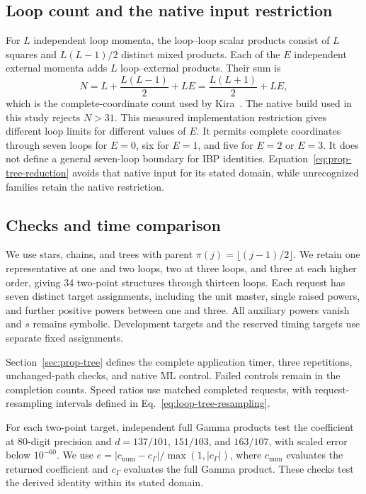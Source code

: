 \subsection{Loop count and the native input restriction}
For $L$ independent loop momenta, the loop--loop scalar products consist of $L$ squares and $L(L-1)/2$ distinct mixed products. Each of the $E$ independent external momenta adds $L$ loop--external products. Their sum is
\begin{equation}
 N=L+\frac{L(L-1)}2+LE=\frac{L(L+1)}2+LE,
 \label{eq:prop-tree-index-count}
\end{equation}
which is the complete-coordinate count used by Kira~\cite{Kira3}. The native build used in this study rejects $N>31$. This measured implementation restriction gives different loop limits for different values of $E$. It permits complete coordinates through seven loops for $E=0$, six for $E=1$, and five for $E=2$ or $E=3$. It does not define a general seven-loop boundary for IBP identities. Equation~\eqref{eq:prop-tree-reduction} avoids that native input for its stated domain, while unrecognized families retain the native restriction.

\subsection{Checks and time comparison}
We use stars, chains, and trees with parent $\pi(j)=\lfloor(j-1)/2\rfloor$. We retain one representative at one and two loops, two at three loops, and three at each higher order, giving 34 two-point structures through thirteen loops. Each request has seven distinct target assignments, including the unit master, single raised powers, and further positive powers between one and three. All auxiliary powers vanish and $s$ remains symbolic. Development targets and the reserved timing targets use separate fixed assignments.

Section~\ref{sec:prop-tree} defines the complete application timer, three repetitions, unchanged-path checks, and native ML control. Failed controls remain in the completion counts. Speed ratios use matched completed requests, with request-resampling intervals defined in Eq.~\eqref{eq:loop-tree-resampling}.

For each two-point target, independent full Gamma products test the coefficient at 80-digit precision and $d=137/101$, $151/103$, and $163/107$, with scaled error below $10^{-60}$. We use $e=|c_{\mathrm{num}}-c_\Gamma|/\max(1,|c_\Gamma|)$, where $c_{\mathrm{num}}$ evaluates the returned coefficient and $c_\Gamma$ evaluates the full Gamma product. These checks test the derived identity within its stated domain.
